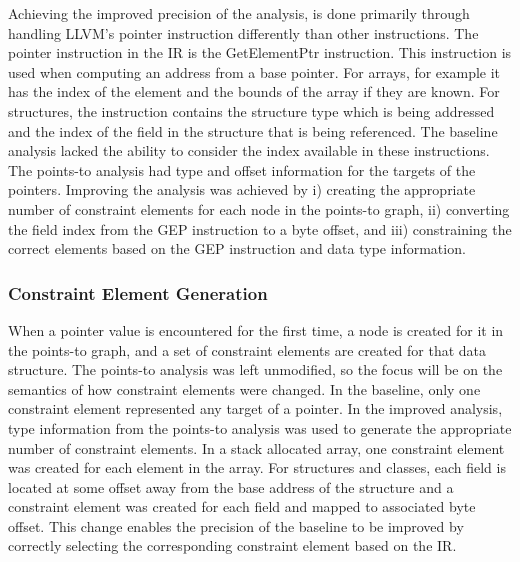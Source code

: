 \documentclass[11pt,a4paper]{article}
\begin{document}
Achieving the improved precision of the analysis, is done primarily through
handling LLVM's pointer instruction differently than other instructions. The
pointer instruction in the IR is the GetElementPtr instruction. This instruction
is used when computing an address from a base pointer. For arrays, for example
it has the index of the element and the bounds of the array if they are known.
For structures, the instruction contains the structure type which is being
addressed and the index of the field in the structure that is being referenced.
The baseline analysis lacked the ability to consider the index available in
these instructions. The points-to analysis had type and offset
information for the targets of the pointers. Improving the analysis was achieved
by i) creating the appropriate number of constraint elements for each node in
the points-to graph, ii) converting the field index from the GEP instruction to
a byte offset, and iii) constraining the correct elements based on
the GEP instruction and data type information.

\subsubsection{Constraint Element Generation}
When a pointer value is encountered for the first time, a node is created for it
in the points-to graph, and a set of constraint elements are created for that
data structure. The points-to analysis was left unmodified, so the focus will be
on the semantics of how constraint elements were changed. In the baseline, only
one constraint element represented any target of a pointer. In the improved
analysis, type information from the points-to analysis was used to generate the
appropriate number of constraint elements. In a stack allocated array, one
constraint element was created for each element in the array. For structures and
classes, each field is located at some offset away from the base address of the
structure and a constraint element was created for each field and mapped to
associated byte offset. This change enables the precision of the baseline to be
improved by correctly selecting the corresponding constraint element based on
the IR.
\end{document}
